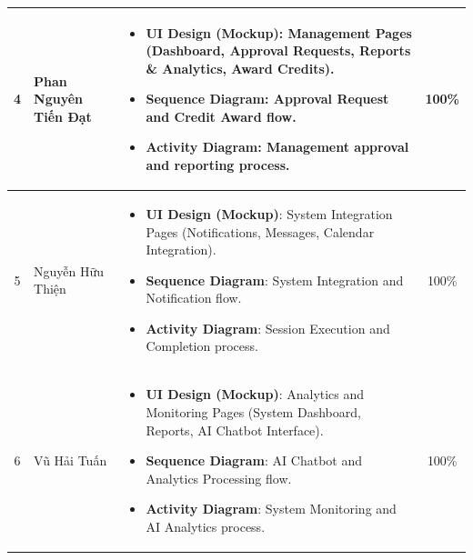 \begin{longtable}{|c|l|p{}|c|}
  4 & Phan Nguyên Tiến Đạt
    & \begin{itemize}[leftmargin=*, nosep]
        \item \textbf{UI Design (Mockup)}: Management Pages (Dashboard, Approval Requests, Reports \& Analytics, Award Credits).
        \item \textbf{Sequence Diagram}: Approval Request and Credit Award flow.
        \item \textbf{Activity Diagram}: Management approval and reporting process.
      \end{itemize}
    & 100\% \\ \hline

  5 & Nguyễn Hữu Thiện
    & \begin{itemize}[leftmargin=*, nosep]
        \item \textbf{UI Design (Mockup)}: System Integration Pages (Notifications, Messages, Calendar Integration).
        \item \textbf{Sequence Diagram}: System Integration and Notification flow.
        \item \textbf{Activity Diagram}: Session Execution and Completion process.
      \end{itemize}
    & 100\% \\ \hline

  6 & Vũ Hải Tuấn
    & \begin{itemize}[leftmargin=*, nosep]
        \item \textbf{UI Design (Mockup)}: Analytics and Monitoring Pages (System Dashboard, Reports, AI Chatbot Interface).
        \item \textbf{Sequence Diagram}: AI Chatbot and Analytics Processing flow.
        \item \textbf{Activity Diagram}: System Monitoring and AI Analytics process.
      \end{itemize}
    & 100\% \\ \hline

\end{longtable}